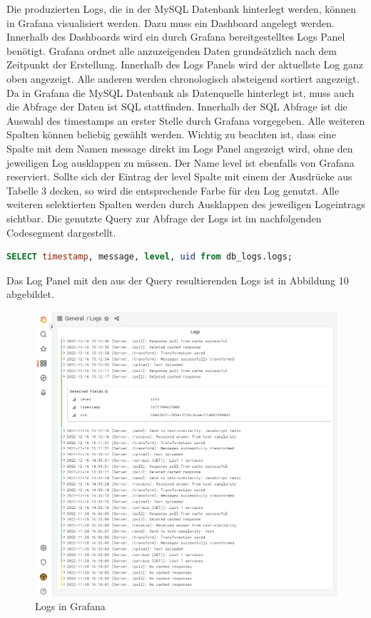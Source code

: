 Die produzierten Logs, die in der MySQL Datenbank hinterlegt werden, können in Grafana visualisiert werden. Dazu muss ein Dashboard angelegt werden. Innerhalb des Dashboards wird ein durch Grafana bereitgestelltes Logs Panel benötigt. Grafana ordnet alle anzuzeigenden Daten grundsätzlich nach dem Zeitpunkt der Erstellung. Innerhalb des Logs Panels wird der aktuellste Log ganz oben angezeigt. Alle anderen werden chronologisch absteigend sortiert angezeigt. Da in Grafana die MySQL Datenbank als Datenquelle hinterlegt ist, muss auch die Abfrage der Daten ist SQL stattfinden. Innerhalb der SQL Abfrage ist die Auswahl des timestamps an erster Stelle durch Grafana vorgegeben. Alle weiteren Spalten können beliebig gewählt werden. Wichtig zu beachten ist, dass eine Spalte mit dem Namen \glqq message\grqq{} direkt im Logs Panel angezeigt wird, ohne den jeweiligen Log ausklappen zu müssen. Der Name \glqq level\grqq{} ist ebenfalls von Grafana reserviert. Sollte sich der Eintrag der \glqq level\grqq{} Spalte mit einem der Ausdrücke aus Tabelle 3 decken, so wird die entsprechende Farbe für den Log genutzt. Alle weiteren selektierten Spalten werden durch Ausklappen des jeweiligen Logeintrags sichtbar. Die genutzte Query zur Abfrage der Logs ist im nachfolgenden Codesegment dargestellt.

\begin{lstlisting}[language=SQL]
SELECT timestamp, message, level, uid from db_logs.logs;
\end{lstlisting}

Das Log Panel mit den aus der Query resultierenden Logs ist in Abbildung 10 abgebildet.

\begin{figure}[H]
  \centering
    \includegraphics[width = 15cm]{bilder/grafana}
    \caption{Logs in Grafana}
\end{figure}

